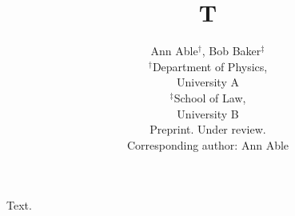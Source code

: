 \documentclass{article}
\title{T}
\author{Ann Able$^{\dagger}$, Bob Baker$^{\ddagger}$ \\ $^\dagger$Department of Physics, \\ University A \\ $^\ddagger$School of Law, \\ University B \\ Preprint. Under review. \\ Corresponding author: Ann Able}
\begin{document}
\maketitle
Text.
\end{document}
